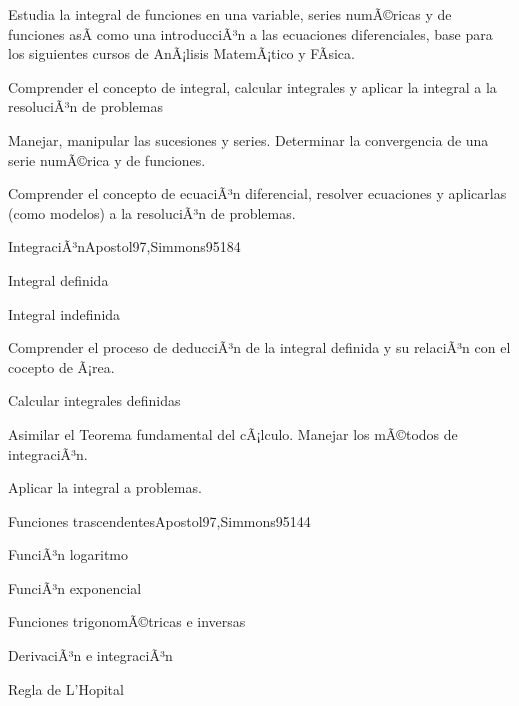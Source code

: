 \begin{syllabus}


\begin{justification}
Estudia la integral de funciones en una variable, series numÃ©ricas y de funciones asÃ­ como una introducciÃ³n a las ecuaciones diferenciales, base para los siguientes cursos de AnÃ¡lisis MatemÃ¡tico y FÃ­sica.
\end{justification}

\begin{goals}
\item Comprender el concepto de integral, calcular integrales y aplicar la integral a la resoluciÃ³n de problemas
\item Manejar, manipular las sucesiones y series. Determinar la convergencia de una serie numÃ©rica y de funciones.
\item Comprender el concepto de ecuaciÃ³n diferencial, resolver ecuaciones y aplicarlas (como modelos) a la resoluciÃ³n de problemas.
\end{goals}

\begin{outcomes}
\end{outcomes}

\begin{unit}{IntegraciÃ³n}{Apostol97,Simmons95}{18}{4}
   \begin{topics}
      \item Integral definida
      \item Integral indefinida
   \end{topics}

   \begin{learningoutcomes}
      \item Comprender el proceso de deducciÃ³n de la integral definida y su relaciÃ³n con el cocepto de Ã¡rea.
      \item Calcular integrales definidas
      \item Asimilar el Teorema fundamental del cÃ¡lculo. Manejar los mÃ©todos de integraciÃ³n.
      \item Aplicar la integral a problemas.
   \end{learningoutcomes}
\end{unit}

\begin{unit}{Funciones trascendentes}{Apostol97,Simmons95}{14}{4}
   \begin{topics}
      \item FunciÃ³n logaritmo
      \item FunciÃ³n exponencial
      \item Funciones trigonomÃ©tricas e inversas
      \item DerivaciÃ³n e integraciÃ³n
      \item Regla de L'Hopital
   \end{topics}


\end{unit}
\end{syllabus}
